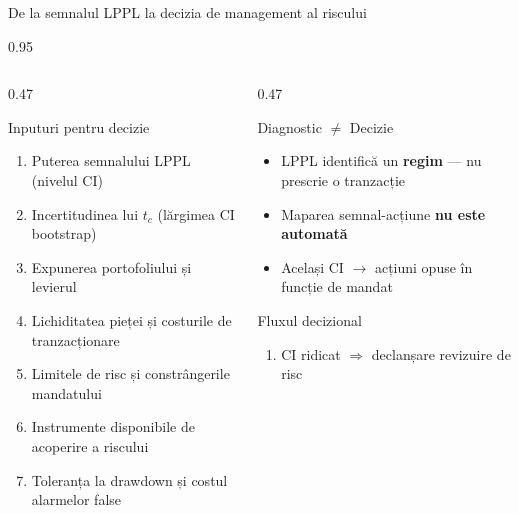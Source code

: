 \documentclass[9pt, aspectratio=169, t]{beamer}
\begin{document}
\begin{frame}{De la semnalul LPPL la decizia de management al riscului}
    \begin{cminipage}{0.95\textwidth}
    {\scriptsize
    \begin{columns}[T]
        \begin{column}{0.47\textwidth}
            \begin{block}{Inputuri pentru decizie}
                \begin{enumerate}\setlength{\itemsep}{0pt}
                    \item Puterea semnalului LPPL (nivelul CI)
                    \item Incertitudinea lui $t_c$ (lărgimea CI bootstrap)
                    \item Expunerea portofoliului și levierul
                    \item Lichiditatea pieței și costurile de tranzacționare
                    \item Limitele de risc și constrângerile mandatului
                    \item Instrumente disponibile de acoperire a riscului
                    \item Toleranța la drawdown și costul alarmelor false
                \end{enumerate}
            \end{block}
        \end{column}
        \begin{column}{0.47\textwidth}
            \begin{alertblock}{Diagnostic $\neq$ Decizie}
                \begin{itemize}\setlength{\itemsep}{0pt}
                    \item LPPL identifică un \textbf{regim} --- nu prescrie o tranzacție
                    \item Maparea semnal-acțiune \textbf{nu este automată}
                    \item Același CI $\to$ acțiuni opuse în funcție de mandat
                \end{itemize}
            \end{alertblock}
            \vspace{-2mm}
            \begin{exampleblock}{Fluxul decizional}
                \begin{enumerate}\setlength{\itemsep}{0pt}
                    \item CI ridicat $\Rightarrow$ declanșare revizuire de risc

\end{enumerate}
\end{exampleblock}
\end{column}
\end{columns}}
\end{cminipage}
\end{frame}
\end{document}

